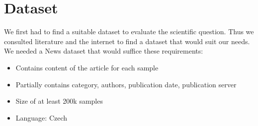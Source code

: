 \chapter{Dataset}
\label{chap:math}

We first had to find a suitable dataset to evaluate the scientific question.
Thus we consulted literature and the internet to find a dataset that would suit our needs.
 We needed a News dataset that would suffice these requirements:

\begin{itemize}
    \item Contains content of the article for each sample
    \item Partially contains category, authors, publication date, publication server
    \item Size of at least 200k samples
    \item Language: Czech
\end{itemize}



